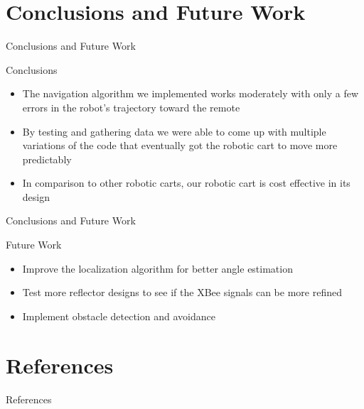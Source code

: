 \documentclass{beamer}
\begin{document}

\section{Conclusions and Future Work}

\begin{frame}{Conclusions and Future Work}
  \begin{block}{Conclusions}
    \begin{itemize}
      \item The navigation algorithm we implemented works moderately with only a few errors in the robot's trajectory toward the remote
      \item By testing and gathering data we were able to come up with multiple variations of the code that eventually got the robotic cart to move more predictably
      \item In comparison to other robotic carts, our robotic cart is cost effective in its design
    \end{itemize}
  \end{block}
\end{frame}

\begin{frame}{Conclusions and Future Work}
  \begin{block}{Future Work}
    \begin{itemize}
      \item Improve the localization algorithm for better angle estimation
      \item Test more reflector designs to see if the XBee signals can be more refined
      \item Implement obstacle detection and avoidance
    \end{itemize}
  \end{block}
\end{frame}


\section{References}

\begin{frame}{References}
  
  
\end{frame}

\end{document}
